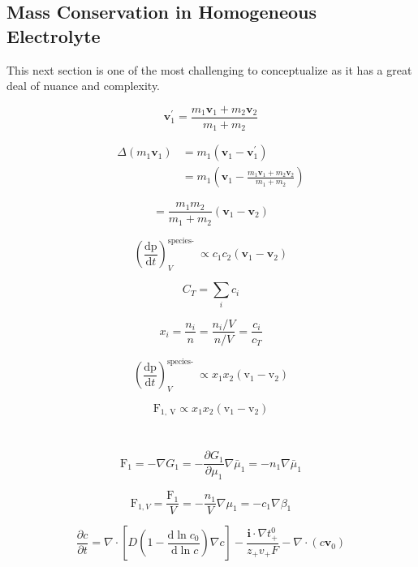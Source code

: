 \documentclass[lettersize,journal]{IEEEtran}
\begin{document}
\subsection{Mass Conservation in Homogeneous Electrolyte}

This next section is one of the most challenging to conceptualize as it has a great deal of nuance and complexity.

\[
\mathbf{v}_{1}^{\prime}=\frac{m_{1} \mathbf{v}_{1}+m_{2} \mathbf{v}_{2}}{m_{1}+m_{2}}
\]

\[
\begin{aligned}
\Delta\left(m_{1} \mathbf{v}_{1}\right) &=m_{1}\left(\mathbf{v}_{1}-\mathbf{v}_{1}^{\prime}\right) \\
&=m_{1}\left(\mathbf{v}_{1}-\frac{m_{1} \mathbf{v}_{1}+m_{2} \mathbf{v}_{2}}{m_{1}+m_{2}}\right)
\end{aligned}
\]

\[
=\frac{m_{1} m_{2}}{m_{1}+m_{2}}\left(\mathbf{v}_{1}-\mathbf{v}_{2}\right)
\]

\[
\left(\frac{\mathrm{dp}}{\mathrm{d} t}\right)_{V}^{\text {species- }} \propto c_{1} c_{2}\left(\mathbf{v}_{1}-\mathbf{v}_{2}\right)
\]

\[
C_{T}=\sum_{i} c_{i}
\]

\[
x_{i}=\frac{n_{i}}{n}=\frac{n_{i} / V}{n / V}=\frac{c_{i}}{c_{T}}
\]

\[
\left(\frac{\mathrm{d} \mathrm{p}}{\mathrm{d} t}\right)_{V}^{\text {species- }} \propto x_{1} x_{2}\left(\mathrm{v}_{1}-\mathrm{v}_{2}\right)
\]

\[
\mathrm{F}_{1, \mathrm{~V}} \propto x_{1} x_{2}\left(\mathrm{v}_{1}-\mathrm{v}_{2}\right)
\]

\[
\]

\[
\]

\[
\mathrm{F}_{1}=-\nabla G_{1}=-\frac{\partial G_{1}}{\partial \mu_{1}} \nabla \bar{\mu}_{1}=-n_{1} \nabla \bar{\mu}_{1}
\]

\[
\mathrm{F}_{1, V}=\frac{\mathrm{F}_{1}}{V}=-\frac{n_{1}}{V} \nabla \mu_{1}=-c_{1} \nabla \beta_{1}
\]






\[
\frac{\partial c}{\partial t}=\nabla \cdot\left[D\left(1-\frac{\mathrm{d} \ln c_{0}}{\mathrm{~d} \ln c}\right) \nabla c\right]-\frac{\mathbf{i} \cdot \nabla t_{+}^{0}}{z_{+} v_{+} F}-\nabla \cdot\left(c \mathbf{v}_{0}\right)
\]
\end{document}
